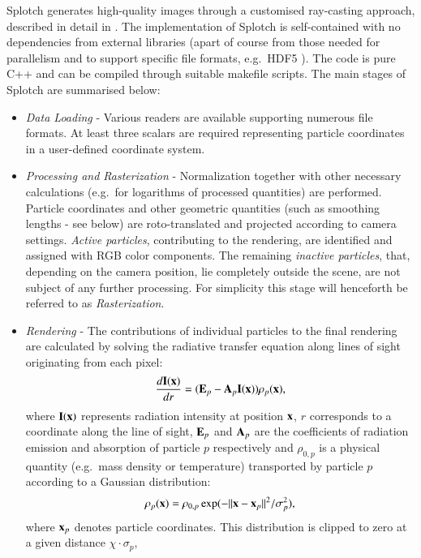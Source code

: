 \documentclass[preprint,5pt]{elsarticle}
\begin{document}
Splotch generates high-quality images through a customised ray-casting approach, described in detail in \cite{2008NJPh...10l5006D}.  
The implementation of Splotch is self-contained with no dependencies from external libraries (apart of course from those needed for parallelism and to support specific file formats, e.g.\ HDF5 \cite{hdf5}). The code is pure C++ and can be compiled through suitable makefile scripts.
The main stages of Splotch are summarised below:
\begin{itemize}
\item
{\it Data Loading} - Various readers are available supporting numerous file formats. At least three scalars are required representing particle coordinates in a user-defined coordinate system.
\item
{\it Processing and Rasterization} - Normalization together with other necessary 
calculations (e.g.\ for logarithms of processed quantities) are performed. Particle
coordinates and other geometric quantities (such as smoothing lengths - see below) are
roto-translated and projected according to camera settings.
{\it Active particles},  contributing to the rendering, are identified and assigned with RGB color components. The remaining
{\it inactive particles}, that, depending on the camera position, lie completely outside the scene, are not subject of any further processing.
For simplicity this stage will henceforth be referred to as {\it Rasterization}.
\item
{\it Rendering} - The contributions of individual particles to the final rendering are calculated by solving the radiative transfer equation  \cite{1991par..book.....S} along lines of sight originating from each pixel:
\begin{equation}\label{rad}
\frac{d{\bf I}{(\bf x})}{dr}=({\bf E}_p-{\bf A}_p{\bf I}({\bf x}))\rho_p({\bf x}),
\end{equation}
where ${\bf I}({\bf x})$ represents radiation intensity at position ${\bf x}$, $r$ corresponds to a coordinate along the line of sight,  ${\bf E}_p$ and ${\bf A}_p$ are the coefficients of radiation emission and absorption of particle $p$ respectively and $\rho_{0,p}$ is a physical quantity (e.g.\ mass density or temperature) transported by particle $p$ according to a Gaussian distribution:
\begin{equation}\label{kernel}
\rho_p({\bf x}) = \rho_{0,p}\exp(-{||{\bf x}-{\bf x}_p||}^2/\sigma_p^2),
\end{equation}
where ${\bf x}_p$ denotes particle coordinates. This distribution is clipped to zero at a given distance $\chi\cdot\sigma_p$, 

\end{itemize}
\end{document}
